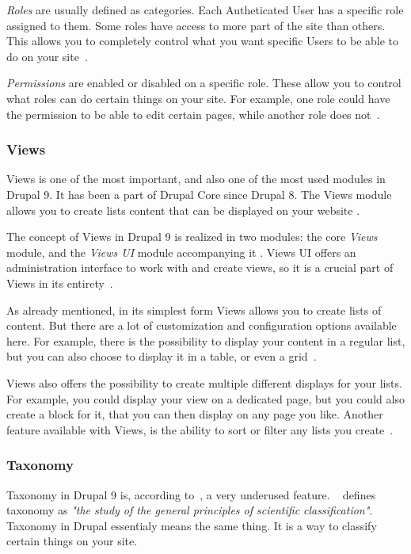 \emph{Roles} are usually defined as categories. Each Autheticated User has a specific role assigned to them. Some roles have access to more part of the site than others. This allows you to completely control what you want specific Users to be able to do on your site~\autocite{Tomlinson2015}.

\emph{Permissions} are enabled or disabled on a specific role. These allow you to control what roles can do certain things on your site. For example, one role could have the permission to be able to edit certain pages, while another role does not~\autocite{Tomlinson2015}.

\subsubsection{Views}

Views is one of the most important, and also one of the most used modules in Drupal 9. It has been a part of Drupal Core since Drupal 8. The Views module allows you to create lists content that can be displayed on your website \autocite{DrupalViews}.

The concept of Views in Drupal 9 is realized in two modules: the core \emph{Views} module, and the \emph{Views UI} module accompanying it \autocite{DrupalViews}. Views UI offers an administration interface to work with and create views, so it is a crucial part of Views in its entirety~\autocite{Tomlinson2015}.

As already mentioned, in its simplest form Views allows you to create lists of content. But there are a lot of customization and configuration options available here. For example, there is the possibility to display your content in a regular list, but you can also choose to display it in a table, or even a grid~\autocite{Tomlinson2015}.

Views also offers the possibility to create multiple different displays for your lists. For example, you could display your view on a dedicated page, but you could also create a block for it, that you can then display on any page you like. Another feature available with Views, is the ability to sort or filter any lists you create~\autocite{Tomlinson2015}.

\subsubsection{Taxonomy}

Taxonomy in Drupal 9 is, according to~\textcite{Tomlinson2015}, a very underused feature. ~\textcite{MerriamWebsterTax} defines taxonomy as \emph{"the study of the general principles of scientific classification"}. Taxonomy in Drupal essentialy means the same thing. It is a way to classify certain things on your site.

